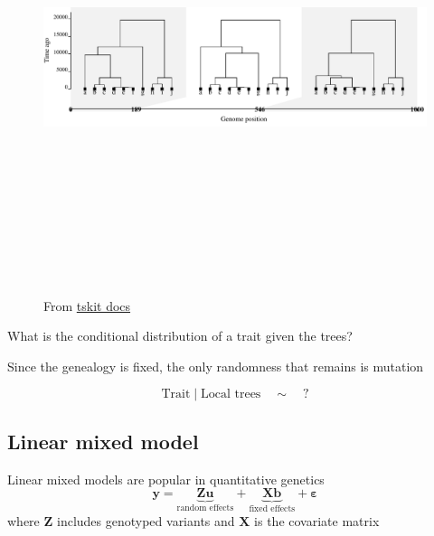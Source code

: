 \documentclass[
  letterpaper,
  DIV=11,
  numbers=noendperiod]{scrartcl}
\begin{document}
\begin{figure}[H]

{\centering \includegraphics[width=\linewidth,height=5.20833in,keepaspectratio]{slides_files/mediabag/imgs/local_trees.pdf}

}

\caption{From \href{https://tskit.dev/tutorials/what_is.html}{tskit
docs}}

\end{figure}%

What is the conditional distribution of a trait given the trees?

Since the genealogy is fixed, the only randomness that remains is
mutation

\[
\text{Trait} \mid \text{Local trees} \quad \sim \quad ?
\]

\subsection{Linear mixed model}\label{linear-mixed-model}

Linear mixed models are popular in quantitative genetics \[
\mathbf{y} = \underbrace{\mathbf{Z}\mathbf{u}}_{\text{random effects}} + \underbrace{\mathbf{X}\mathbf{b}}_{\text{fixed effects}} + \boldsymbol{\varepsilon}
\] where \(\mathbf{Z}\) includes genotyped variants and \(\mathbf{X}\)
is the covariate matrix
\end{document}
